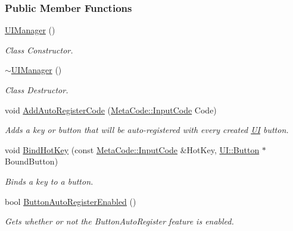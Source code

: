 \subsubsection*{Public Member Functions}
\begin{DoxyCompactItemize}
\item 
\hyperlink{classMezzanine_1_1UIManager_a2101862a8b3f08f2fa657b0bffb75bd0}{UIManager} ()
\begin{DoxyCompactList}\small\item\em Class Constructor. \item\end{DoxyCompactList}\item 
\hyperlink{classMezzanine_1_1UIManager_ad480071e4f02d2e24903da56425e6b6a}{$\sim$UIManager} ()
\begin{DoxyCompactList}\small\item\em Class Destructor. \item\end{DoxyCompactList}\item 
void \hyperlink{classMezzanine_1_1UIManager_a79796c009d0481370bd66d7006016776}{AddAutoRegisterCode} (\hyperlink{classMezzanine_1_1MetaCode_a3b5633f0145bf3287cf53a3f05b5563c}{MetaCode::InputCode} Code)
\begin{DoxyCompactList}\small\item\em Adds a key or button that will be auto-\/registered with every created \hyperlink{namespaceMezzanine_1_1UI}{UI} button. \item\end{DoxyCompactList}\item 
void \hyperlink{classMezzanine_1_1UIManager_aa4f168f84cc9ab88d04964913b3982f3}{BindHotKey} (const \hyperlink{classMezzanine_1_1MetaCode_a3b5633f0145bf3287cf53a3f05b5563c}{MetaCode::InputCode} \&HotKey, \hyperlink{classMezzanine_1_1UI_1_1Button}{UI::Button} $\ast$BoundButton)
\begin{DoxyCompactList}\small\item\em Binds a key to a button. \item\end{DoxyCompactList}\item 
bool \hyperlink{classMezzanine_1_1UIManager_a7e88a8d25ae95440032333179f2f493f}{ButtonAutoRegisterEnabled} ()
\begin{DoxyCompactList}\small\item\em Gets whether or not the ButtonAutoRegister feature is enabled. \item\end{DoxyCompactList}\item 

\end{DoxyCompactItemize}

